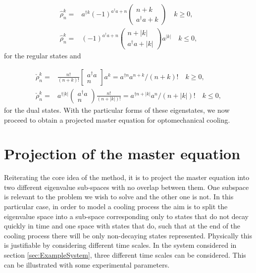 \documentclass[12pt]{article}
\begin{document}
\begin{align}
    \hat{\rho}_n^k=&\nonumber a^{\dagger k}(-1)^{a^{\dagger} a+n}\left(\begin{array}{c}
n+k \\
a^{\dagger} a+k
\end{array}\right) \quad k \geq 0, \\
\hat{\rho}_n^k=& \nonumber (-1)^{a^{\dagger} a+n}\left(\begin{array}{c}
n+|k| \\
a^{\dagger} a+|k|
\end{array}\right) a^{|k|} \quad k \leq 0,
\end{align} for the regular states and 

\begin{align}
    \check{\rho}_n^k =&\nonumber  \frac{n !}{(n+k) !}\left[\begin{array}{c}
a^{\dagger} a \\
n
\end{array}\right] a^{k}=a^{\dagger n} a^{n+k} /(n+k) ! \quad k \geq 0,\\
\check{\rho}_n^k =&\nonumber a^{\dagger|k|}\left(\begin{array}{c}
a^{\dagger} a \\
n
\end{array}\right) \frac{n !}{(n+|k|) !}=a^{\dagger n+|k|} a^{n} /(n+|k|) ! \quad k \leq 0,
\end{align} for the dual states. With the particular forms of these eigenstates, we now proceed to obtain a projected master equation for optomechanical cooling.


\section{Projection of the master equation}

Reiterating the core idea of the method, it is to project the master equation into two different eigenvalue sub-spaces with no overlap between them. One subspace is relevant to the problem we wish to solve and the other one is not. In this particular case, in order to model a cooling process the aim is to split the eigenvalue space into a sub-space corresponding only to states that do not decay quickly in time and one space with states that do, such that at the end of the cooling process there will be only non-decaying states represented. Physically this is justifiable by considering different time scales. In the system considered in section \ref{sec:ExampleSystem}, three different time scales can be considered. This can be illustrated with some experimental parameters.
\end{document}
